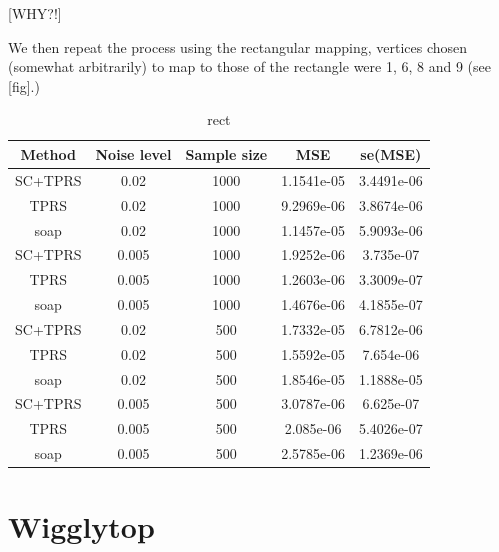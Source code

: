 \documentclass[a4paper,10pt]{amsart}
\begin{document}
[WHY?!]


We then repeat the process using the rectangular mapping, vertices chosen (somewhat arbitrarily) to map to those of the rectangle were 1, 6, 8 and 9 (see [fig].)



\begin{table}[ht]
\begin{tabular}{c c c c c}\\
Method & Noise level & Sample size & MSE & se(MSE)\\
\hline
\hline
SC+TPRS & 0.02 & 1000 & 1.1541e-05 & 3.4491e-06\\
TPRS & 0.02 & 1000 & 9.2969e-06 & 3.8674e-06\\
soap & 0.02 & 1000 & 1.1457e-05 & 5.9093e-06\\
SC+TPRS & 0.005 & 1000 & 1.9252e-06 & 3.735e-07\\
TPRS & 0.005 & 1000 & 1.2603e-06 & 3.3009e-07\\
soap & 0.005 & 1000 & 1.4676e-06 & 4.1855e-07\\
SC+TPRS & 0.02 & 500 & 1.7332e-05 & 6.7812e-06\\
TPRS & 0.02 & 500 & 1.5592e-05 & 7.654e-06\\
soap & 0.02 & 500 & 1.8546e-05 & 1.1888e-05\\
SC+TPRS & 0.005 & 500 & 3.0787e-06 & 6.625e-07\\
TPRS & 0.005 & 500 & 2.085e-06 & 5.4026e-07\\
soap & 0.005 & 500 & 2.5785e-06 & 1.2369e-06\\
\end{tabular}
\caption{rect}
\label{}
\end{table}











\section{Wigglytop}
\end{document}
